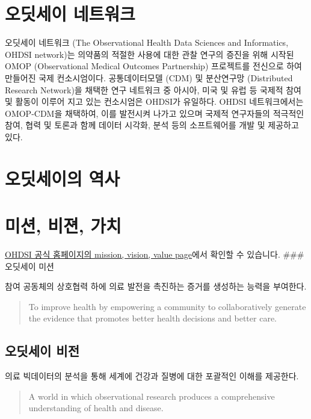 \documentclass[]{book}
\begin{document}
\hypertarget{OHDSINetwork}{%
\section{오딧세이 네트워크}\label{OHDSINetwork}}

오딧세이 네트워크 (The Observational Health Data Sciences and Informatics, OHDSI network)는 의약품의 적절한 사용에 대한 관찰 연구의 증진을 위해 시작된 OMOP (Observational Medical Outcomes Partnership) 프로젝트를 전신으로 하여 만들어진 국제 컨소시엄이다. 공통데이터모델 (CDM) 및 분산연구망 (Distributed Research Network)을 채택한 연구 네트워크 중 아시아, 미국 및 유럽 등 국제적 참여 및 활동이 이루어 지고 있는 컨소시엄은 OHDSI가 유일하다. OHDSI 네트워크에서는 OMOP-CDM을 채택하여, 이를 발전시켜 나가고 있으며 국제적 연구자들의 적극적인 참여, 협력 및 토론과 함께 데이터 시각화, 분석 등의 소프트웨어를 개발 및 제공하고 있다.

\hypertarget{OHDSIHistory}{%
\section{오딧세이의 역사}\label{OHDSIHistory}}

\hypertarget{MissionVissionValues}{%
\section{미션, 비젼, 가치}\label{MissionVissionValues}}

\href{https://www.ohdsi.org/who-we-are/mission-vision-values/}{OHDSI 공식 홈페이지의 mission, vision, value page}에서 확인할 수 있습니다.
\#\#\# 오딧세이 미션

참여 공동체의 상호협력 하에 의료 발전을 촉진하는 증거를 생성하는 능력을 부여한다.

\begin{quote}
To improve health by empowering a community to collaboratively generate the evidence that promotes better health decisions and better care.
\end{quote}

\hypertarget{section}{%
\subsection{오딧세이 비전}\label{section}}

의료 빅데이터의 분석을 통해 세계에 건강과 질병에 대한 포괄적인 이해를 제공한다.

\begin{quote}
A world in which observational research produces a comprehensive understanding of health and disease.
\end{quote}
\end{document}
